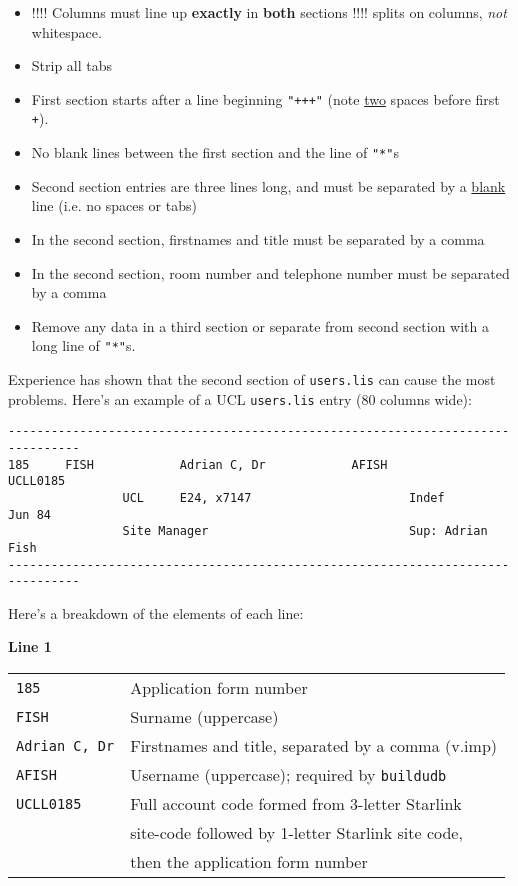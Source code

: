 \begin{itemize}
\item !!!! Columns must line up {\bf exactly} in {\bf both} sections !!!!
       splits on columns, {\it not} whitespace.
\item Strip all tabs
\item First section starts after a line beginning {\tt "\hspace{2em}+++"} (note
      \underline{two} spaces before first {\tt +}).
\item No blank lines between the first section and the line of {\tt"*"}s
\item Second section entries are three lines long, and must be separated by
      a \underline{blank} line (i.e. no spaces or tabs)
\item In the second section, firstnames and title must be separated by a
      comma
\item In the second section, room number and telephone number must be
      separated by a comma
\item Remove any data in a third section or separate from second section
      with a long line of {\tt "*"}s.
\end{itemize}


Experience has shown that the second section of {\tt users.lis} can cause
the most problems. Here's an example of a UCL {\tt users.lis} entry (80
columns wide):

\begin{small}
\begin{verbatim}
--------------------------------------------------------------------------------
185     FISH            Adrian C, Dr            AFISH                   UCLL0185
                UCL     E24, x7147                      Indef             Jun 84
                Site Manager                            Sup: Adrian Fish
--------------------------------------------------------------------------------
\end{verbatim}
\end{small}

Here's a breakdown of the elements of each line:

{\bf Line 1}

\begin{center}
\begin{tabular}{ll}
{\tt 185}          & Application form number\\
{\tt FISH}         & Surname (uppercase)\\
{\tt Adrian C, Dr} & Firstnames and title, separated by a comma (v.imp)\\
{\tt AFISH}        & Username (uppercase); required by {\tt buildudb}\\
{\tt UCLL0185}     & Full account code formed from 3-letter Starlink \\
                   & site-code followed by 1-letter Starlink site code, \\
                   & then the application form number \\
\end{tabular}
\end{center}


